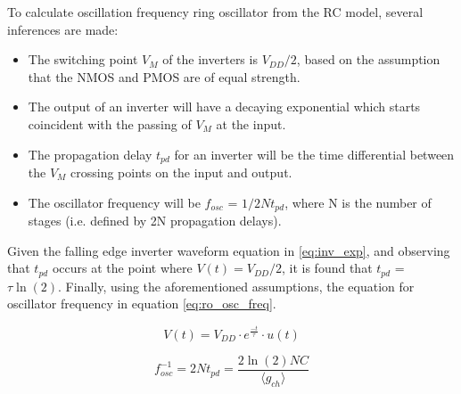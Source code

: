 		To calculate oscillation frequency ring oscillator from the RC model, several inferences are made:
		\begin{itemize}
			\item The switching point $V_M$ of the inverters is $V_{DD}/2$, based on the assumption that the NMOS and PMOS are of equal strength.
			\item The output of an inverter will have a decaying exponential which starts coincident with the passing of $V_M$ at the input.
			\item The propagation delay $t_{pd}$ for an inverter will be the time differential between the $V_M$ crossing points on the input and output.
			\item The oscillator frequency will be $f_{osc}$ = $1/2Nt_{pd}$, where N is the number of stages (i.e. defined by 2N propagation delays).
		\end{itemize}
			Given the falling edge inverter waveform equation in \ref{eq:inv_exp}, and observing that $t_{pd}$ occurs at the point where $V(t) = V_{DD}/2$, it is found that $t_{pd}$ = $\tau\ln(2)$. Finally, using the aforementioned assumptions, the equation for oscillator frequency in equation \ref{eq:ro_osc_freq}.

			\begin{equation}\label{eq:inv_exp}
			V(t) = V_{DD}\cdot e^{\frac{-t}{\tau}}\cdot u(t)
			\end{equation}

			\begin{equation}\label{eq:ro_osc_freq}
				f_{osc}^{-1} = 2Nt_{pd} = \frac{2\ln(2)NC}{\langle g_{ch}\rangle}
			\end{equation}


